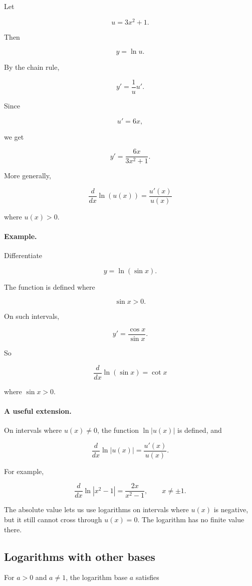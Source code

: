 Let

\[
u=3x^2+1.
\]

Then

\[
y=\ln u.
\]

By the chain rule,

\[
y'=\frac1u u'.
\]

Since

\[
u'=6x,
\]

we get

\[
\boxed{
y'=\frac{6x}{3x^2+1}.
}
\]

More generally,

\[
\boxed{
\frac{d}{dx}\ln(u(x))=\frac{u'(x)}{u(x)}
}
\]

where \(u(x)>0\).

\paragraph{Example.}
Differentiate

\[
y=\ln(\sin x).
\]

The function is defined where

\[
\sin x>0.
\]

On such intervals,

\[
y'=\frac{\cos x}{\sin x}.
\]

So

\[
\boxed{
\frac{d}{dx}\ln(\sin x)=\cot x
}
\]

where \(\sin x>0\).

\paragraph{A useful extension.}
On intervals where \(u(x)\neq0\), the function \(\ln|u(x)|\) is defined, and

\[
\boxed{
\frac{d}{dx}\ln|u(x)|=\frac{u'(x)}{u(x)}.
}
\]

For example,

\[
\frac{d}{dx}\ln|x^2-1|
=
\frac{2x}{x^2-1},
\qquad x\neq\pm1.
\]

The absolute value lets us use logarithms on intervals where \(u(x)\) is negative, but it still cannot cross through \(u(x)=0\).  The logarithm has no finite value there.

\subsection{Logarithms with other bases}
\label{subsec:derivative-log-base-a}

For \(a>0\) and \(a\neq1\), the logarithm base \(a\) satisfies

